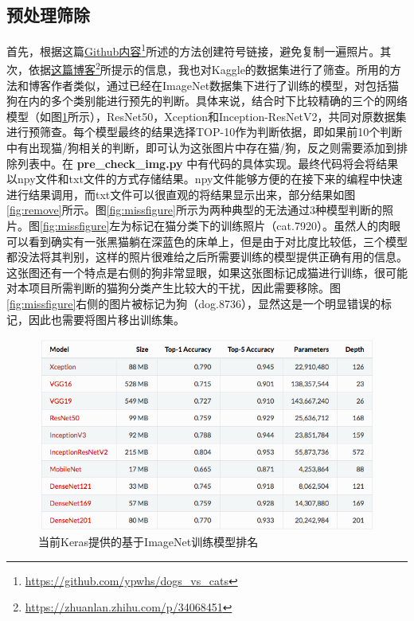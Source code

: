 \documentclass[a4paper,11pt]{article}
\begin{document}
\subsection{预处理筛除}
\label{sec:orged867fd}
首先，根据这篇\href{https://github.com/ypwhs/dogs\_vs\_cats}{Github内容}\footnote{\url{https://github.com/ypwhs/dogs\_vs\_cats}}所述的方法创建符号链接，避免复制一遍照片。其次，依据\href{https://zhuanlan.zhihu.com/p/34068451}{这篇博客}\footnote{\url{https://zhuanlan.zhihu.com/p/34068451}}所提示的信息，我也对Kaggle的数据集进行了筛查。所用的方法和博客作者类似，通过已经在ImageNet数据集下进行了训练的模型，对包括猫狗在内的多个类别能进行预先的判断。具体来说，结合时下比较精确的三个的网络模型（如图\ref{fig:keras}所示），ResNet50，Xception和Inception-ResNetV2，共同对原数据集进行预筛查。每个模型最终的结果选择TOP-10作为判断依据，即如果前10个判断中有出现猫/狗相关的判断，即可认为这张图片中存在猫/狗，反之则需要添加到排除列表中。在 \textbf{pre\_check\_img.py} 中有代码的具体实现。最终代码将会将结果以npy文件和txt文件的方式存储结果。npy文件能够方便的在接下来的编程中快速进行结果调用，而txt文件可以很直观的将结果显示出来，部分结果如图\ref{fig:remove}所示。图\ref{fig:missfigure}所示为两种典型的无法通过3种模型判断的照片。图\ref{fig:missfigure}左为标记在猫分类下的训练照片（cat.7920）。虽然人的肉眼可以看到确实有一张黑猫躺在深蓝色的床单上，但是由于对比度比较低，三个模型都没法将其判别，这样的照片很难给之后所需要训练的模型提供正确有用的信息。这张图还有一个特点是右侧的狗非常显眼，如果这张图标记成猫进行训练，很可能对本项目所需判断的猫狗分类产生比较大的干扰，因此需要移除。图\ref{fig:missfigure}右侧的图片被标记为狗（dog.8736），显然这是一个明显错误的标记，因此也需要将图片移出训练集。

\begin{figure}[htb]
\centering
\includegraphics[scale=0.55]{./figure/keras.png}
\caption{当前Keras提供的基于ImageNet训练模型排名}
\label{fig:keras}
\end{figure}
\end{document}
